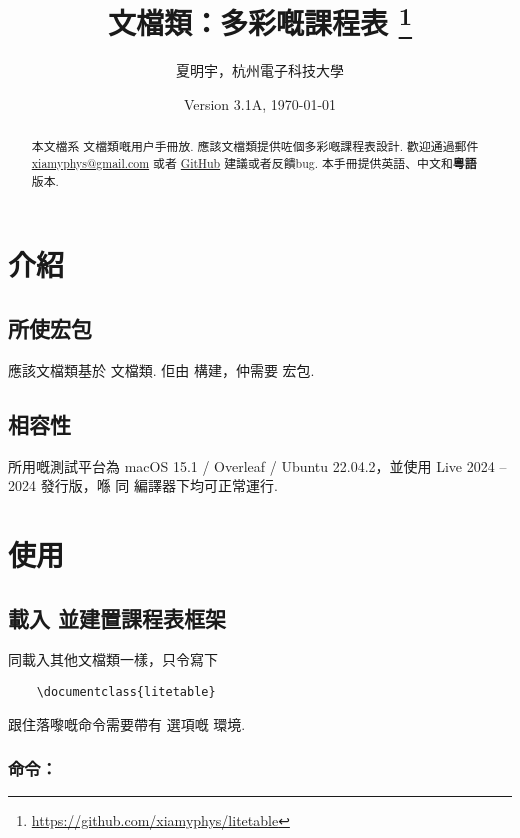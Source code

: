 \documentclass[letterpaper]{l3doc}
\title{
    \cls{litetable} 文檔類：多彩嘅課程表
    \thanks{\url{https://github.com/xiamyphys/litetable}}
}
\author{夏明宇，杭州電子科技大學}
\affil{\href{mailto:xiamyphys@gmail.com}{xiamyphys@gmail.com}}
\date{Version 3.1A, \today}
\begin{document}
\maketitle

\begin{abstract}
    本文檔系  文檔類嘅用户手冊放. 應該文檔類提供咗個多彩嘅課程表設計. 歡迎通過郵件 \href{mailto:xiamyphys@gmail.com}{xiamyphys@gmail.com} 或者 \href{https://github.com/xiamyphys/litetable/issues}{GitHub} 建議或者反饋bug. 本手冊提供英語、中文和\textbf{粵語}版本.
\end{abstract}

\section{介紹}

\subsection{所使宏包}

應該文檔類基於  文檔類. 佢由  構建，仲需要  宏包. 

\subsection{相容性}

所用嘅測試平台為 macOS 15.1 / Overleaf / Ubuntu 22.04.2，並使用 Live 2024 -- 2024 發行版，喺  同  編譯器下均可正常運行.

\section{使用}

\subsection{載入  並建置課程表框架}

同載入其他文檔類一樣，只令寫下

\begin{Verbatim}
    \documentclass{litetable}
\end{Verbatim}

跟住落嚟嘅命令需要帶有  選項嘅  環境.

\subsubsection{命令：}
\end{document}
